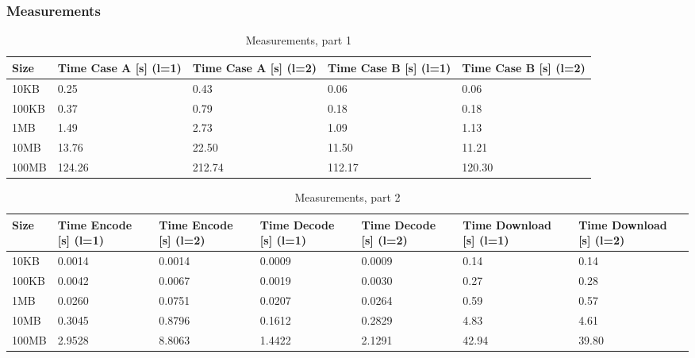 \subsubsection*{Measurements}
\begin{table}[H]
    \begin{tabularx}{\textwidth}{|X|X|X|X|X|}
        \hline
        \cellcolor{lightgray}\textbf{Size} & \cellcolor{lightgray}\textbf{Time Case A [s] (l=1)} & \cellcolor{lightgray}\textbf{Time Case A [s] (l=2)} & \cellcolor{lightgray}\textbf{Time Case B [s] (l=1)} & \cellcolor{lightgray}\textbf{Time Case B [s] (l=2)} \\\hline
        10KB  & 0.25   & 0.43   & 0.06   & 0.06   \\\hline
        100KB & 0.37   & 0.79   & 0.18   & 0.18   \\\hline
        1MB   & 1.49   & 2.73   & 1.09   & 1.13   \\\hline
        10MB  & 13.76  & 22.50  & 11.50  & 11.21  \\\hline
        100MB & 124.26 & 212.74 & 112.17 & 120.30 \\\hline
    \end{tabularx}
    \caption{Measurements, part 1}
	\label{tab:e3meas1}
\end{table}

\begin{table}[H]
    \begin{tabularx}{\textwidth}{|X|X|X|X|X|X|X|}
        \hline
        \cellcolor{lightgray}\textbf{Size} & \cellcolor{lightgray}\textbf{Time Encode [s] (l=1)} & \cellcolor{lightgray}\textbf{Time Encode [s] (l=2)} & \cellcolor{lightgray}\textbf{Time Decode [s] (l=1)} & \cellcolor{lightgray}\textbf{Time Decode [s] (l=2)} & \cellcolor{lightgray}\textbf{Time Download [s] (l=1)} & \cellcolor{lightgray}\textbf{Time Download [s] (l=2)} \\\hline
        10KB  & 0.0014 & 0.0014 & 0.0009 & 0.0009 & 0.14  & 0.14  \\\hline
        100KB & 0.0042 & 0.0067 & 0.0019 & 0.0030 & 0.27  & 0.28  \\\hline
        1MB   & 0.0260 & 0.0751 & 0.0207 & 0.0264 & 0.59  & 0.57  \\\hline
        10MB  & 0.3045 & 0.8796 & 0.1612 & 0.2829 & 4.83  & 4.61  \\\hline
        100MB & 2.9528 & 8.8063 & 1.4422 & 2.1291 & 42.94 & 39.80 \\\hline
    \end{tabularx}
    \caption{Measurements, part 2}
	\label{tab:e3meas2}
\end{table}

